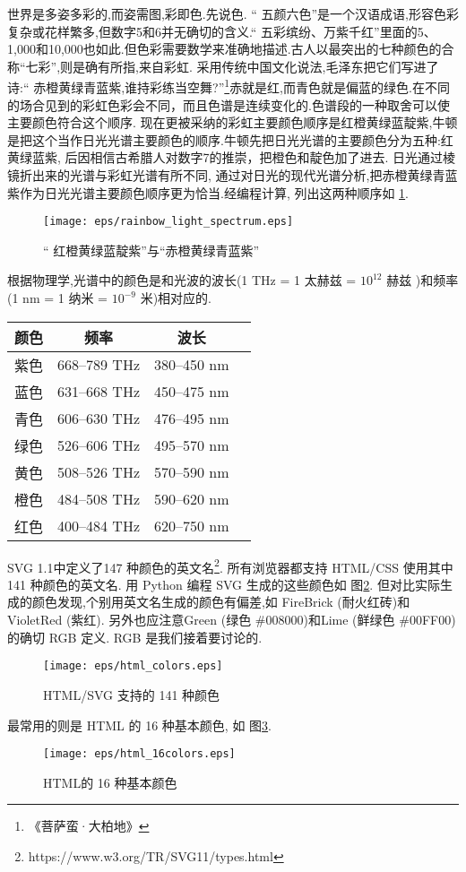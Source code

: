 世界是多姿多彩的,而姿需图,彩即色.先说色.
“ 五颜六色”是一个汉语成语,形容色彩复杂或花样繁多,但数字5和6并无确切的含义.“ 
五彩缤纷、万紫千红”里面的5、1,000和10,000也如此.但色彩需要数学来准确地描述.古人以最突出的七种颜色的合称“七彩”,则是确有所指,来自彩虹.
采用传统中国文化说法,毛泽东把它们写进了诗:“ 赤橙黄绿青蓝紫,谁持彩练当空舞?”\footnote{《菩萨蛮·大柏地》}赤就是红,而青色就是偏蓝的绿色.在不同的场合见到的彩虹色彩会不同，而且色谱是连续变化的.色谱段的一种取舍可以使主要颜色符合这个顺序.
现在更被采纳的彩虹主要颜色顺序是红橙黄绿蓝靛紫,牛顿是把这个当作日光光谱主要颜色的顺序.牛顿先把日光光谱的主要颜色分为五种:红黄绿蓝紫,
后因相信古希腊人对数字7的推崇，把橙色和靛色加了进去.
日光通过棱镜折出来的光谱与彩虹光谱有所不同,
通过对日光的现代光谱分析,把赤橙黄绿青蓝紫作为日光光谱主要颜色顺序更为恰当.经编程计算, 列出这两种顺序如 \ref{fig:1.4.1}.

\begin{figure}[h]
	\centering
	\texttt{[image: eps/rainbow\_light\_spectrum.eps]}
	\caption{“ 红橙黄绿蓝靛紫”与“赤橙黄绿青蓝紫” }
	\label{fig:1.4.1}
\end{figure}
根据物理学,光谱中的颜色是和光波的波长(1 THz = 1 太赫兹 = $10^{12}$ 赫兹 )和频率(1 nm = 1 纳米 = $10^{-9}$ 米)相对应的.
\begin{center}
	\begin{tabular}{c c c c} 
		\hline
		颜色 & 频率 & 波长  \\ [0.5ex] 
		\hline
		紫色 & 668–789 THz & 380–450 nm \\
		蓝色 & 631–668 THz & 450–475 nm \\
		青色 & 606–630 THz & 476–495 nm \\
		绿色 & 526–606 THz & 495–570 nm \\
		黄色 & 508–526 THz & 570–590 nm \\
		橙色 & 484–508 THz & 590–620 nm \\
		红色 & 400–484 THz & 620–750 nm \\		
		\hline
	\end{tabular}
\end{center}

SVG 1.1中定义了147 种颜色的英文名\footnote{https://www.w3.org/TR/SVG11/types.html}.
所有浏览器都支持 HTML/CSS 使用其中 141 种颜色的英文名.
用 Python 编程 SVG 生成的这些颜色如 图\ref{fig:1.4.2}.
但对比实际生成的颜色发现,个别用英文名生成的颜色有偏差,如 FireBrick (耐火红砖)和
VioletRed (紫红). 另外也应注意Green (绿色 \#{}008000)和Lime (鲜绿色 \#{}00FF00)的确切 RGB 定义. RGB 是我们接着要讨论的.

\begin{figure}[h]
	\centering
	\texttt{[image: eps/html\_colors.eps]}
	\caption{HTML/SVG 支持的 141 种颜色}
	\label{fig:1.4.2}
\end{figure}

最常用的则是 HTML 的 16 种基本颜色, 如 图\ref{fig:1.4.3}.

\begin{figure}
	\centering
	\texttt{[image: eps/html\_16colors.eps]}
	\caption{HTML的 16 种基本颜色}
	\label{fig:1.4.3}
\end{figure}


